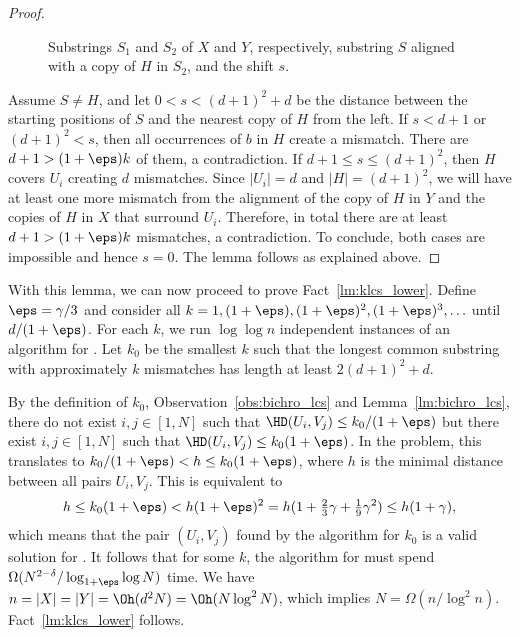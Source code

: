 \begin{proof}
\begin{figure}[H]
\begin{center}
{

}
\end{center}
\caption{Substrings $S_1$ and $S_2$ of $X$ and $Y$, respectively, substring $S$ aligned with a copy of $H$ in $S_2$, and the shift $s$.}
\end{figure}

Assume $S \neq H$, and let $0 < s < (d+1)^2 + d$ be the distance between the starting positions of $S$ and the nearest copy of $H$ from the left. If $s < d+1$ or $(d+1)^2 < s$, then all occurrences of $b$ in $H$ create a mismatch. There are $d+1 > (1+\eps)k$ of them, a contradiction. If $d+1 \leq s \le (d+1)^2$, then $H$ covers $U_i$ creating $d$ mismatches. Since $|U_i| = d$ and $|H|=(d+1)^2$, we will have at least one more mismatch from the alignment of the copy of $H$ in $Y$ and the copies of $H$ in $X$ that surround $U_i$. Therefore, in total there are at least $d+1 > (1+\eps)k$ mismatches, a contradiction. To conclude, both cases are impossible and hence $s = 0$. The lemma follows as explained above.
\end{proof}
With this lemma, we can now proceed to prove Fact~\ref{lm:klcs_lower}.
Define $\eps = \gamma/3$ and consider all $k = 1, (1+\eps), (1+\eps)^2, (1+\eps)^3, \ldots$ until $d/(1+\eps)$. For each $k$, we run $\log \log n$ independent instances of an algorithm for \kApproxLCS. Let $k_0$ be the smallest $k$ such that the longest common substring with approximately $k$ mismatches has length at least $2(d+1)^2 + d$.

By the definition of $k_0$, Observation~\ref{obs:bichro_lcs} and Lemma~\ref{lm:bichro_lcs}, there do not exist $i,j \in [1,N]$ such that $\HD(U_i,V_j) \leq k_0/(1+\eps)$ but there exist $i,j \in [1,N]$ such that $\HD(U_i,V_j) \leq k_0(1+\eps)$.
In the \Bichromatic problem, this translates to $ k_0/(1+\eps) < h \leq k_0(1+\eps)$, where $h$ is the minimal distance between all pairs $U_i,V_j$.
This is equivalent to
\[h \leq k_0(1+\eps) < h(1+\eps)^2 = h(1+\tfrac23\gamma + \tfrac19\gamma^2) \leq h(1+\gamma),\]
which means that the pair $(U_i,V_j)$ found by the algorithm for $k_0$ is a valid solution for \Bichromatic. It follows that for some $k$, the algorithm for \kApproxLCS must spend $\Omega(N^{2-\delta} / \log_{1+\eps} \log N)$ time. We have $n = |X| = |Y| = \Oh(d^2 N) = \Oh(N \log^2 N)$, which implies $N = \Omega(n / \log^2 n)$. Fact~\ref{lm:klcs_lower} follows.
